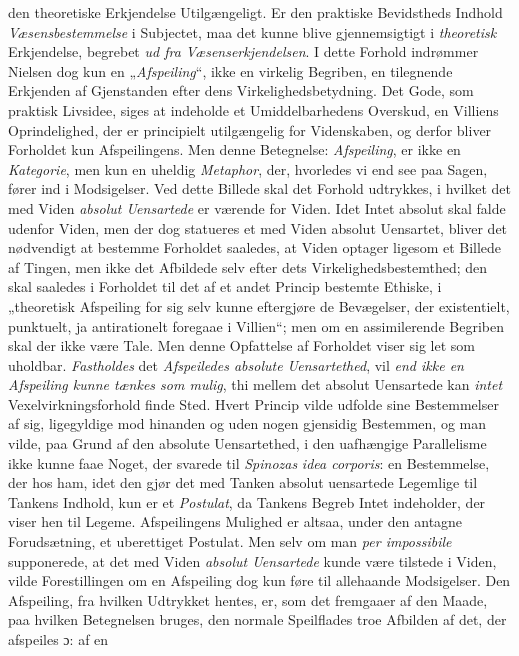 \documentclass[12pt,a4paper]{book}
\newcommand{\opage}[1]{\marginnote{\footnotesize\textit{[#1]}}}
\begin{document}
den theoretiske Erkjendelse Utilgængeligt. Er den praktiske Bevidstheds
Indhold \emph{Væsensbestemmelse} i Subjectet, maa det kunne blive
gjennemsigtigt i \emph{theoretisk} Erkjendelse, begrebet \emph{ud fra Væsenserkjendelsen}. I dette Forhold indrømmer Nielsen dog kun en „\emph{Afspeiling}“, ikke en virkelig Begriben, en tilegnende Erkjenden af
Gjenstanden efter dens Virkelighedsbetydning. Det Gode, som praktisk
Livsidee, siges at indeholde et Umiddelbarhedens Overskud, en Villiens
Oprindelighed, der er principielt utilgængelig for Videnskaben, og
derfor bliver Forholdet kun Afspeilingens. Men denne Betegnelse:
\emph{Afspeiling}, er ikke en \emph{Kategorie}, men kun en uheldig \emph{Metaphor}, der,
hvorledes vi end see paa Sagen, fører ind i Modsigelser. Ved dette
Billede skal det Forhold udtrykkes, i hvilket det med Viden \emph{absolut Uensartede} er værende for Viden. Idet Intet absolut skal falde udenfor
Viden, men der dog statueres et med Viden absolut Uensartet, bliver det
nødvendigt at bestemme Forholdet saaledes, at Viden optager ligesom et
Billede af Tingen, \opage{149}men ikke det Afbildede selv efter dets
Virkelighedsbestemthed; den skal saaledes i Forholdet til det af et
andet Princip bestemte Ethiske, i „theoretisk Afspeiling for sig selv
kunne eftergjøre de Bevægelser, der existentielt, punktuelt, ja
antirationelt foregaae i Villien“; men om en assimilerende Begriben
skal der ikke være Tale. Men denne Opfattelse af Forholdet viser sig
let som uholdbar. \emph{Fastholdes} det \emph{Afspeiledes absolute
Uensartethed}, vil \emph{end ikke en Afspeiling kunne tænkes som mulig}, thi mellem det absolut Uensartede kan \emph{intet} Vexelvirkningsforhold finde Sted. Hvert Princip vilde udfolde sine
Bestemmelser af sig, ligegyldige mod hinanden og uden nogen gjensidig
Bestemmen, og man vilde, paa Grund af den absolute Uensartethed, i den
uafhængige Parallelisme ikke kunne faae Noget, der svarede til \emph{Spinozas}
\textit{idea corporis}: en Bestemmelse, der hos ham, idet den gjør det
med Tanken absolut uensartede Legemlige til Tankens Indhold, kun er et \emph{Postulat}, da Tankens Begreb Intet indeholder, der viser hen til Legeme.
Afspeilingens Mulighed er altsaa, under den antagne Forudsætning, et
uberettiget Postulat. Men selv om man \textit{per impossibile}
supponerede, at det med Viden \emph{absolut Uensartede} kunde være tilstede i
Viden, vilde Forestillingen om en Afspeiling dog kun føre til
allehaande Modsigelser. Den Afspeiling, fra hvilken Udtrykket hentes,
er, som det fremgaaer af den Maade, paa hvilken Betegnelsen bruges, den
normale Speilflades troe Afbilden af det, der afspeiles ɔ: af en
\end{document}
